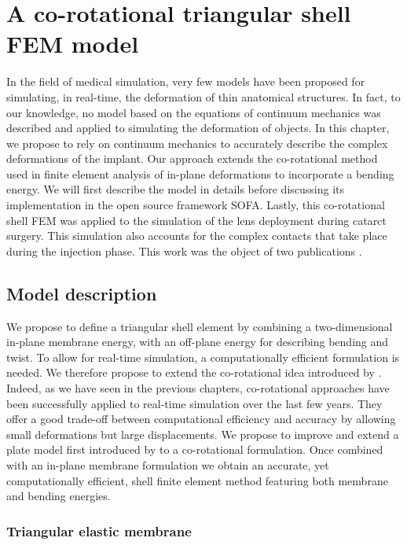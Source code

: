 \chapter{A co-rotational triangular shell FEM model}
\label{chap9}
\begin{shortAbstract}
In the field of medical simulation, very few models have been proposed for simulating, in real-time, the deformation of thin anatomical structures. In fact, to our knowledge, no model based on the equations of continuum mechanics was described and applied to simulating the deformation of objects. In this chapter, we propose to rely on continuum mechanics to accurately describe the complex deformations of the implant. Our approach extends the co-rotational method used in finite element analysis of in-plane deformations to incorporate a bending energy. We will first describe the model in details before discussing its implementation in the open source framework SOFA. Lastly, this co-rotational shell FEM was applied to the simulation of the lens deployment during catarct surgery. This simulation also accounts for the complex contacts that take place during the injection phase. This work was the object of two publications \citep{Comas2010a,Comas2010b}.
\end{shortAbstract}


\section{Model description}

We propose to define a triangular shell element by combining a two-dimensional in-plane membrane energy, with an off-plane energy for describing bending and twist. To allow for real-time simulation, a computationally efficient formulation is needed. We therefore propose to extend the co-rotational idea introduced by \cite{Felippa00}. Indeed, as we have seen in the previous chapters, co-rotational approaches have been successfully applied to real-time simulation over the last few years. They offer a good trade-off between computational efficiency and accuracy by allowing small deformations but large displacements. We propose to improve and extend a plate model first introduced by \cite{Przemieniecki85} to a co-rotational formulation. Once combined with an in-plane membrane formulation we obtain an accurate, yet computationally efficient, shell finite element method featuring both membrane and bending energies. 

\subsection{Triangular elastic membrane}

